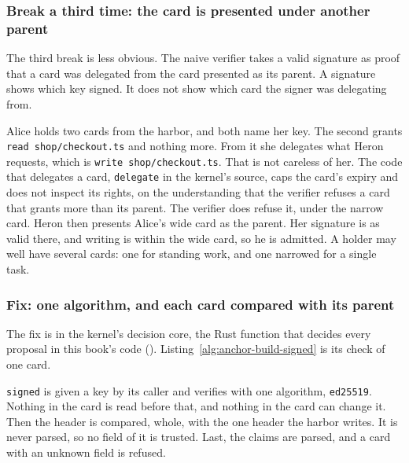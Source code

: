 \subsubsection{Break a third time: the card is presented under another parent}

The third break is less obvious. The naive verifier takes a valid signature
as proof that a card was delegated from the card presented as its parent. A
signature shows which key signed. It does not show which card the signer
was delegating from.


Alice holds two cards from the harbor, and both name her key. The second
grants \texttt{read shop/checkout.ts} and nothing more. From it she
delegates what Heron requests, which is \texttt{write shop/checkout.ts}.
That is not careless of her. The code that delegates a card,
\texttt{delegate} in the kernel's source, caps the card's expiry and does not
inspect its rights, on the understanding that the verifier refuses a card
that grants more than its parent. The verifier does refuse it, under the
narrow card. Heron then presents Alice's wide card as the parent. Her
signature is as valid there, and writing is within the wide card, so he is
admitted. A holder may well have several cards: one for standing work, and
one narrowed for a single task.

\subsubsection{Fix: one algorithm, and each card compared with its parent}

The fix is in the kernel's decision core, the Rust function that decides
every proposal in this book's code
().
Listing~\ref{alg:anchor-build-signed} is its check of one card.


\texttt{signed} is given a key by its caller and verifies with one
algorithm, \texttt{ed25519}. Nothing in the card is read before that, and
nothing in the card can change it. Then the header is compared, whole, with
the one header the harbor writes. It is never parsed, so no field of it is
trusted. Last, the claims are parsed, and a card with an unknown field is
refused.

